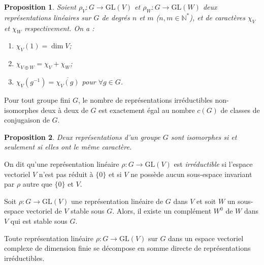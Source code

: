 \documentclass[9pt]{beamer}
\newtheorem{proposition}{Proposition}
\begin{document}
\begin{frame}
\begin{proposition}
Soient \( \rho_V : G \rightarrow \mathrm{GL}(V) \) et \( \rho_W : G \rightarrow \mathrm{GL}(W) \) deux représentations linéaires sur \( G \) de degrés \( n \) et \( m \) (\( n, m \in \mathbb{N}^* \)), et de caractères \( \chi_V \) et \( \chi_W \) respectivement. On a :
	\begin{enumerate}[label=\roman*)]
		\item \( \chi_V(1) = \dim V \);
		\item \( \chi_{V \oplus W} = \chi_V + \chi_W \);
		\item \( \chi_V(g^{-1}) = \overline{\chi_V(g)} \) \quad pour \( \forall g \in G \).
	\end{enumerate}
\end{proposition}

\begin{theorem}[Frobenius] 
Pour tout groupe fini \( G \), le nombre de représentations irréductibles non-isomorphes deux à deux de \( G \) est exactement égal au nombre \( c(G) \) de classes de conjugaison de \( G \).
\end{theorem}

\begin{proposition} 
Deux représentations d’un groupe \( G \) sont isomorphes si et seulement si elles ont le même caractère.
\end{proposition}

\end{frame}



\begin{frame}
\begin{definition}
	On dit qu'une représentation linéaire \( \rho : G \rightarrow \mathrm{GL}(V) \) est \emph{irréductible} si l'espace vectoriel \( V \) n'est pas réduit à \( \{0\} \) et si \( V \) ne possède aucun sous-espace invariant par \( \rho \) autre que \( \{0\} \) et \( V \).
\end{definition}

\begin{theorem} 
	Soit \( \rho : G \to \mathrm{GL}(V) \) une représentation linéaire de \( G \) dans \( V \) et soit \( W \) un sous-espace vectoriel de \( V \) stable sous \( G \). Alors, il existe un complément \( W^0 \) de \( W \) dans \( V \) qui est stable sous \( G \).
\end{theorem}

\begin{theorem} 
	Toute représentation linéaire \( \rho : G \to \mathrm{GL}(V) \) sur \( G \) dans un espace vectoriel complexe de dimension finie se décompose en somme directe de représentations irréductibles.
\end{theorem}

\end{frame}
\end{document}
